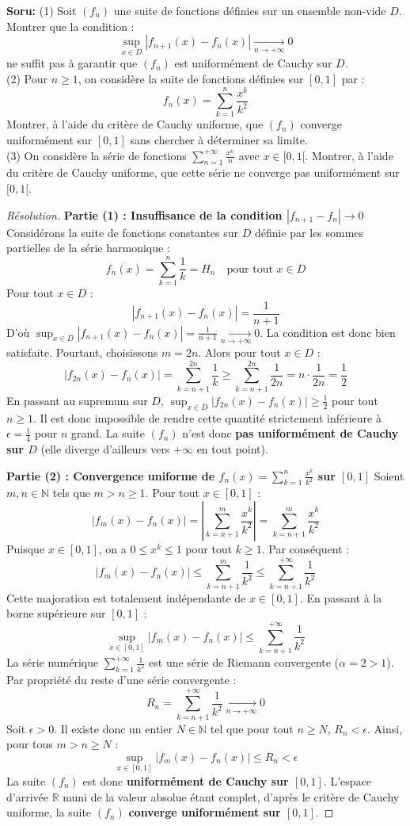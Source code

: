 \documentclass[12pt,a4paper]{report}
\begin{document}
\textbf{Soru:}
(1) Soit $(f_n)$ une suite de fonctions définies sur un ensemble non-vide $D$. Montrer que la condition :
\[ \sup_{x \in D} |f_{n+1}(x) - f_n(x)| \xrightarrow[n \to +\infty]{} 0 \]
ne suffit pas à garantir que $(f_n)$ est uniformément de Cauchy sur $D$.\\
(2) Pour $n \ge 1$, on considère la suite de fonctions définies sur $[0, 1]$ par :
\[ f_n(x) = \sum_{k=1}^n \frac{x^k}{k^2} \]
Montrer, à l'aide du critère de Cauchy uniforme, que $(f_n)$ converge uniformément sur $[0, 1]$ sans chercher à déterminer sa limite.\\
(3) On considère la série de fonctions $\sum_{n=1}^{+\infty} \frac{x^n}{n}$ avec $x \in [0, 1[$. Montrer, à l'aide du critère de Cauchy uniforme, que cette série ne converge pas uniformément sur $[0, 1[$.

\begin{proof}[Résolution]
\textbf{Partie (1) : Insuffisance de la condition $|f_{n+1}-f_n| \to 0$}
Considérons la suite de fonctions constantes sur $D$ définie par les sommes partielles de la série harmonique :
\[ f_n(x) = \sum_{k=1}^n \frac{1}{k} = H_n \quad \text{pour tout } x \in D \]
Pour tout $x \in D$ :
\[ |f_{n+1}(x) - f_n(x)| = \frac{1}{n+1} \]
D'où $\sup_{x \in D} |f_{n+1}(x) - f_n(x)| = \frac{1}{n+1} \xrightarrow[n \to +\infty]{} 0$. La condition est donc bien satisfaite.
Pourtant, choisissons $m = 2n$. Alors pour tout $x \in D$ :
\[ |f_{2n}(x) - f_n(x)| = \sum_{k=n+1}^{2n} \frac{1}{k} \ge \sum_{k=n+1}^{2n} \frac{1}{2n} = n \cdot \frac{1}{2n} = \frac{1}{2} \]
En passant au supremum sur $D$, $\sup_{x \in D} |f_{2n}(x) - f_n(x)| \ge \frac{1}{2}$ pour tout $n \ge 1$.
Il est donc impossible de rendre cette quantité strictement inférieure à $\epsilon = \frac{1}{4}$ pour $n$ grand.
La suite $(f_n)$ n'est donc \textbf{pas uniformément de Cauchy sur $D$} (elle diverge d'ailleurs vers $+\infty$ en tout point).

\textbf{Partie (2) : Convergence uniforme de $f_n(x) = \sum_{k=1}^n \frac{x^k}{k^2}$ sur $[0, 1]$}
Soient $m, n \in \mathbb{N}$ tels que $m > n \ge 1$. Pour tout $x \in [0, 1]$ :
\[ |f_m(x) - f_n(x)| = \left| \sum_{k=n+1}^m \frac{x^k}{k^2} \right| = \sum_{k=n+1}^m \frac{x^k}{k^2} \]
Puisque $x \in [0, 1]$, on a $0 \le x^k \le 1$ pour tout $k \ge 1$. Par conséquent :
\[ |f_m(x) - f_n(x)| \le \sum_{k=n+1}^m \frac{1}{k^2} \le \sum_{k=n+1}^{+\infty} \frac{1}{k^2} \]
Cette majoration est totalement indépendante de $x \in [0, 1]$. En passant à la borne supérieure sur $[0, 1]$ :
\[ \sup_{x \in [0, 1]} |f_m(x) - f_n(x)| \le \sum_{k=n+1}^{+\infty} \frac{1}{k^2} \]
La série numérique $\sum_{k=1}^{+\infty} \frac{1}{k^2}$ est une série de Riemann convergente ($\alpha = 2 > 1$). Par propriété du reste d'une série convergente :
\[ R_n = \sum_{k=n+1}^{+\infty} \frac{1}{k^2} \xrightarrow[n \to +\infty]{} 0 \]
Soit $\epsilon > 0$. Il existe donc un entier $N \in \mathbb{N}$ tel que pour tout $n \ge N$, $R_n < \epsilon$.
Ainsi, pour tous $m > n \ge N$ :
\[ \sup_{x \in [0, 1]} |f_m(x) - f_n(x)| \le R_n < \epsilon \]
La suite $(f_n)$ est donc \textbf{uniformément de Cauchy sur $[0, 1]$}.
L'espace d'arrivée $\mathbb{R}$ muni de la valeur absolue étant complet, d'après le critère de Cauchy uniforme, la suite $(f_n)$ \textbf{converge uniformément sur $[0, 1]$}.


\end{proof}
\end{document}
